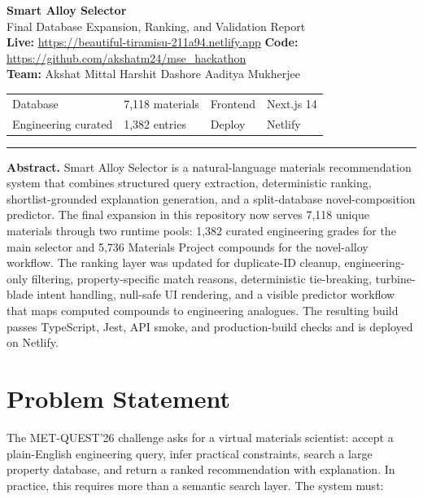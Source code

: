 \documentclass[11pt,a4paper]{article}
\begin{document}
\begin{center}
{\Large\bfseries Smart Alloy Selector}\\[4pt]
{\normalsize Final Database Expansion, Ranking, and Validation Report}\\[6pt]
{\small
\textbf{Live:} \url{https://beautiful-tiramisu-211a94.netlify.app}
\quad
\textbf{Code:} \url{https://github.com/akshatm24/mse_hackathon}
}\\[4pt]
{\small
\textbf{Team:} Akshat Mittal \quad Harshit Dashore \quad Aaditya Mukherjee
}\\[6pt]
\begin{tabular}{ll|ll}
Database & 7,118 materials & Frontend & Next.js 14 \\
Engineering curated & 1,382 entries & Deploy & Netlify \\
\end{tabular}
\end{center}

\rule{\linewidth}{0.5pt}

\begin{highlight}
\textbf{Abstract.}
Smart Alloy Selector is a natural-language materials recommendation system that combines structured query extraction, deterministic ranking, shortlist-grounded explanation generation, and a split-database novel-composition predictor. The final expansion in this repository now serves 7,118 unique materials through two runtime pools: 1,382 curated engineering grades for the main selector and 5,736 Materials Project compounds for the novel-alloy workflow. The ranking layer was updated for duplicate-ID cleanup, engineering-only filtering, property-specific match reasons, deterministic tie-breaking, turbine-blade intent handling, null-safe UI rendering, and a visible predictor workflow that maps computed compounds to engineering analogues. The resulting build passes TypeScript, Jest, API smoke, and production-build checks and is deployed on Netlify.
\end{highlight}

\section{Problem Statement}

The MET-QUEST'26 challenge asks for a virtual materials scientist: accept a plain-English engineering query, infer practical constraints, search a large property database, and return a ranked recommendation with explanation. In practice, this requires more than a semantic search layer. The system must:
\end{document}
